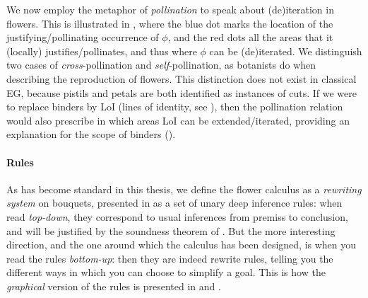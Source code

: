 We now employ the metaphor of \emph{pollination} to speak about (de)iteration in
flowers. This is illustrated in , where the blue dot marks
the location of the justifying/pollinating occurrence of $\phi$, and the red
dots all the areas that it (locally) justifies/pollinates, and thus where $\phi$
can be (de)iterated. We distinguish two cases of \emph{cross}-pollination
and \emph{self}-pollination, as botanists do when describing the reproduction of
flowers. This distinction does not exist in classical EG, because pistils and
petals are both identified as instances of cuts. If we were to replace binders
by LoI (lines of identity, see ), then the pollination relation
would also prescribe in which areas LoI can be extended/iterated, providing an
explanation for the scope of binders ().

\paragraph{Rules}

As has become standard in this thesis, we define the flower calculus as a
\emph{rewriting system} on bouquets, presented in  as a
set of unary deep inference rules: when read \emph{top-down}, they correspond to
usual inferences from premiss to conclusion, and will be justified by the
soundness theorem of .
But the more interesting direction, and the one around which the calculus has
been designed, is when you read the rules \emph{bottom-up}: then they are indeed
rewrite rules, telling you the different ways in which you can choose to
simplify a goal. This is how the \emph{graphical} version of the rules is
presented in  and .

